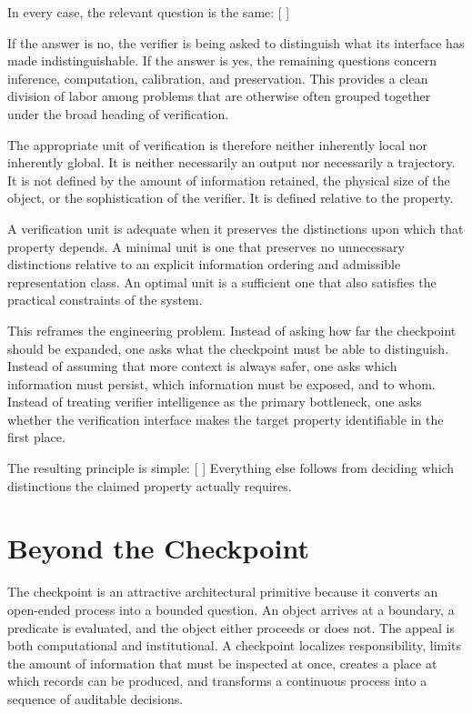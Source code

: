 \documentclass[11pt]{article}
\begin{document}
In every case, the relevant question is the same:
[
]

If the answer is no, the verifier is being asked to distinguish what its interface has made indistinguishable. If the answer is yes, the remaining questions concern inference, computation, calibration, and preservation. This provides a clean division of labor among problems that are otherwise often grouped together under the broad heading of verification.

The appropriate unit of verification is therefore neither inherently local nor inherently global. It is neither necessarily an output nor necessarily a trajectory. It is not defined by the amount of information retained, the physical size of the object, or the sophistication of the verifier. It is defined relative to the property.

A verification unit is adequate when it preserves the distinctions upon which that property depends. A minimal unit is one that preserves no unnecessary distinctions relative to an explicit information ordering and admissible representation class. An optimal unit is a sufficient one that also satisfies the practical constraints of the system.

This reframes the engineering problem. Instead of asking how far the checkpoint should be expanded, one asks what the checkpoint must be able to distinguish. Instead of assuming that more context is always safer, one asks which information must persist, which information must be exposed, and to whom. Instead of treating verifier intelligence as the primary bottleneck, one asks whether the verification interface makes the target property identifiable in the first place.

The resulting principle is simple:
[
]
Everything else follows from deciding which distinctions the claimed property actually requires.

\section{Beyond the Checkpoint}

The checkpoint is an attractive architectural primitive because it converts an open-ended process into a bounded question. An object arrives at a boundary, a predicate is evaluated, and the object either proceeds or does not. The appeal is both computational and institutional. A checkpoint localizes responsibility, limits the amount of information that must be inspected at once, creates a place at which records can be produced, and transforms a continuous process into a sequence of auditable decisions.
\end{document}

